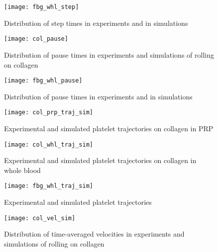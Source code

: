 \begin{figure}
  \centering
  \texttt{[image: fbg\_whl\_step]}
  \caption{Distribution of step times in experiments and in
    simulations}
  \label{fig:fbg-whl-step}
\end{figure}


\begin{figure}
  \centering
  \texttt{[image: col\_pause]}
  \caption[Pause times on collagen]{Distribution of pause times in
    experiments and simulations of rolling on collagen}
  \label{fig:col-pause}
\end{figure}

\begin{figure}
  \centering
  \texttt{[image: fbg\_whl\_pause]}
  \caption{Distribution of pause times in experiments and in
    simulations}
  \label{fig:fbg-whl-pause}
\end{figure}

\begin{figure}
  \centering
  \texttt{[image: col\_prp\_traj\_sim]}
  \caption{Experimental and simulated platelet trajectories on
    collagen in PRP}
  \label{fig:col-traj-sim}
\end{figure}

\begin{figure}
  \centering
  \texttt{[image: col\_whl\_traj\_sim]}
  \caption{Experimental and simulated platelet trajectories on
    collagen in whole blood}
  \label{fig:col-traj-sim}
\end{figure}

\begin{figure}
  \centering
  \texttt{[image: fbg\_whl\_traj\_sim]}
  \caption{Experimental and simulated platelet trajectories}
  \label{fig:fbg-whl-traj-sim}
\end{figure}

\begin{figure}
  \centering
  \texttt{[image: col\_vel\_sim]}
  \caption[Average velocities on collagen]{Distribution of
    time-averaged velocities in experiments and simulations of rolling
    on collagen}
  \label{fig:col-vel}
\end{figure}

